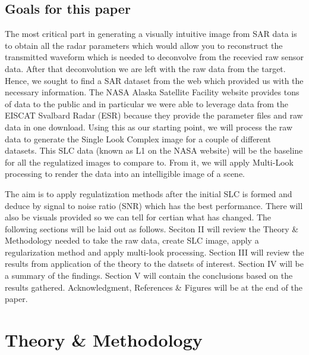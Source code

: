 \documentclass[conference]{IEEEtran}
\begin{document}
\subsection{Goals for this paper}
\par The most critical part in generating a visually intuitive image from SAR data is to obtain all the radar parameters which would allow you to reconstruct the transmitted waveform which is needed to deconvolve from the recevied raw sensor data. After that deconvolution we are left with the raw data from the target. Hence, we sought to find a SAR dataset from the web which provided us with the necessary information. The NASA Alaska Satellite Facility \cite{data} website provides tons of data to the public and in particular we were able to leverage data from the EISCAT Svalbard Radar (ESR) because they provide the parameter files and raw data in one download. Using this as our starting point, we will process the raw data to generate the Single Look Complex image for a couple of different datasets. This SLC data (known as L1 on the NASA website) will be the baseline for all the regulatized images to compare to. From it, we will apply Multi-Look processing \cite{sarIntro} to render the data into an intelligible image of a scene.  
\par The aim is to apply regulatization methods after the initial SLC is formed and deduce by signal to noise ratio (SNR) which has the best performance. There will also be visuals provided so we can tell for certian what has changed. The following sections will be laid out as follows. Seciton II will review the Theory \& Methodology needed to take the raw data, create SLC image, apply a regularization method and apply multi-look processing. Section III will review the results from application of the theory to the datsets of interest. Section IV will be a summary of the findings. Section V will contain the conclusions based on the results gathered. Acknowledgment, References \& Figures will be at the end of the paper. 
\section{Theory \& Methodology}
\end{document}

